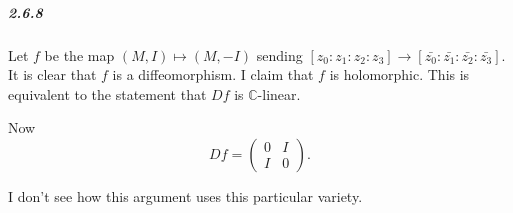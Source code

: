 \documentclass[10pt,letter]{article}
\begin{document}
\subparagraph{2.6.8} Let $f$ be the map $(M,I) \mapsto (M,-I)$ sending $[z_0:z_1:z_2:z_3] \rightarrow [\bar{z_0}:\bar{z_1}:\bar{z_2}:\bar{z_3}]$. It is clear that $f$ is a diffeomorphism. I claim that $f$ is holomorphic. This is equivalent to the statement that $Df$ is $\mathbb{C}$-linear. 

Now \[ Df = \left( \begin{array}{cc} 0 & I \\ I & 0 \end{array} \right).\]  

I don't see how this argument uses this particular variety. 
\end{document}
